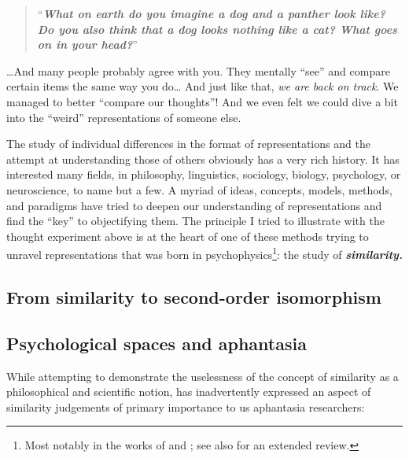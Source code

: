 \documentclass[
  authoryear]{elsarticle}
\begin{document}
\begin{quote}
``\textbf{\emph{What on earth do you imagine a dog and a panther look
like? Do you also think that a dog looks nothing like a cat? What goes
on in your head?}}''
\end{quote}

\ldots And many people probably agree with you. They mentally ``see''
and compare certain items the same way you do\ldots{} And just like
that, \emph{we are back on track}. We managed to better ``compare our
thoughts''! And we even felt we could dive a bit into the ``weird''
representations of someone else.

The study of individual differences in the format of representations and
the attempt at understanding those of others obviously has a very rich
history. It has interested many fields, in philosophy, linguistics,
sociology, biology, psychology, or neuroscience, to name but a few. A
myriad of ideas, concepts, models, methods, and paradigms have tried to
deepen our understanding of representations and find the ``key'' to
objectifying them. The principle I tried to illustrate with the thought
experiment above is at the heart of one of these methods trying to
unravel representations that was born in psychophysics\footnote{Most
  notably in the works of \citet{fechner1860} and \citet{mach1890a}; see
  also \citet{roads2024} for an extended review.}: the study of
\textbf{\emph{similarity.}}

\subsection{From similarity to second-order
isomorphism}\label{from-similarity-to-second-order-isomorphism}

\subsection{Psychological spaces and
aphantasia}\label{psychological-spaces-and-aphantasia}

While attempting to demonstrate the uselessness of the concept of
similarity as a philosophical and scientific notion,
\citet{goodmanSevenStricturesSimilarity1972} has inadvertently expressed
an aspect of similarity judgements of primary importance to us
aphantasia researchers:
\end{document}
